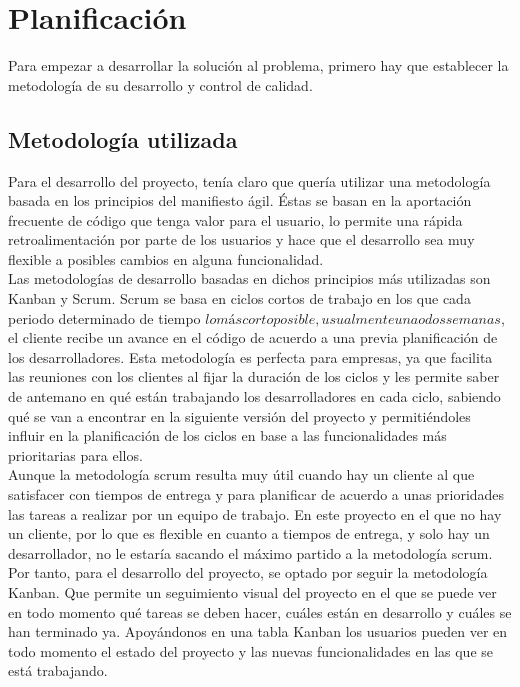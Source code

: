 \chapter{Planificación}
Para empezar a desarrollar la solución al problema, primero hay que establecer la metodología de su desarrollo y
control de calidad.\\

\section{Metodología utilizada}
Para el desarrollo del proyecto, tenía claro que quería utilizar una metodología basada en los principios del
manifiesto ágil\cite{agile}. Éstas se basan en la aportación frecuente de código que tenga valor para el usuario, lo
permite una rápida retroalimentación por parte de los usuarios y hace que el desarrollo sea muy flexible a posibles
cambios en alguna funcionalidad.\\

Las metodologías de desarrollo basadas en dichos principios más utilizadas son Kanban\cite{kanban} y Scrum\cite{scrum}.
Scrum se basa en ciclos cortos de trabajo en los que cada periodo determinado de tiempo \(lo más corto posible,
usualmente una o dos semanas\), el cliente recibe un avance en el código de acuerdo a una previa planificación de los
desarrolladores. Esta metodología es perfecta para empresas, ya que facilita las reuniones con los clientes al fijar la
duración de los ciclos y les permite saber de antemano en qué están trabajando los desarrolladores en cada ciclo,
sabiendo qué se van a encontrar en la siguiente versión del proyecto y permitiéndoles influir en la planificación de
los ciclos en base a las funcionalidades más prioritarias para ellos.\\

Aunque la metodología scrum resulta muy útil cuando hay un cliente al que satisfacer con tiempos de entrega y para
planificar de acuerdo a unas prioridades las tareas a realizar por un equipo de trabajo. En este proyecto en el que no
hay un cliente, por lo que es flexible en cuanto a tiempos de entrega, y solo hay un desarrollador, no le estaría
sacando el máximo partido a la metodología scrum.\\

Por tanto, para el desarrollo del proyecto, se optado por seguir la metodología Kanban. Que permite un seguimiento
visual del proyecto en el que se puede ver en todo momento qué tareas se deben hacer, cuáles están en desarrollo y
cuáles se han terminado ya. Apoyándonos en una tabla Kanban los usuarios pueden ver en todo momento el estado del
proyecto y las nuevas funcionalidades en las que se está trabajando. \\

